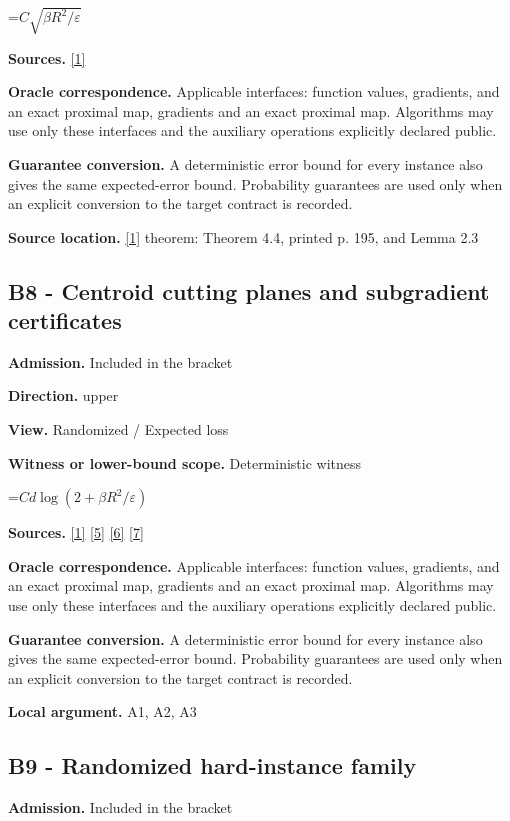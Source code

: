 \documentclass[10pt,a4paper]{article}
\newcommand{\AtlasMath}[1]{\par\begingroup\centering\setbox0=\hbox{$\displaystyle #1$}\ifdim\wd0>1.4\linewidth\typeout{ATLAS WIDE FORMULA: \the\wd0}\fi\ifdim\wd0>\linewidth\resizebox{\linewidth}{!}{\box0}\else\box0\fi\par\endgroup}
\begin{document}
\AtlasMath{C\sqrt{\beta R^2/\varepsilon}}
\textbf{Sources.} \href{https://www.tau.ac.il/~becka/FISTA.pdf}{[1]}

\textbf{Oracle correspondence.} Applicable interfaces: function values, gradients, and an exact proximal map, gradients and an exact proximal map. Algorithms may use only these interfaces and the auxiliary operations explicitly declared public.

\textbf{Guarantee conversion.} A deterministic error bound for every instance also gives the same expected-error bound. Probability guarantees are used only when an explicit conversion to the target contract is recorded.

\textbf{Source location.} \href{https://www.tau.ac.il/~becka/FISTA.pdf}{[1]} theorem: Theorem 4.4, printed p. 195, and Lemma 2.3

\subsection{B8 - Centroid cutting planes and subgradient certificates}
\textbf{Admission.} Included in the bracket

\textbf{Direction.} upper

\textbf{View.} Randomized / Expected loss

\textbf{Witness or lower-bound scope.} Deterministic witness

\AtlasMath{Cd\log(2+\beta R^2/\varepsilon)}
\textbf{Sources.} \href{https://www.tau.ac.il/~becka/FISTA.pdf}{[1]} \href{https://arxiv.org/pdf/1405.4980}{[5]} \href{https://www2.isye.gatech.edu/~nemirovs/MOR_AccuracyCertificates.pdf}{[6]} \href{https://arxiv.org/pdf/2609.20701}{[7]}

\textbf{Oracle correspondence.} Applicable interfaces: function values, gradients, and an exact proximal map, gradients and an exact proximal map. Algorithms may use only these interfaces and the auxiliary operations explicitly declared public.

\textbf{Guarantee conversion.} A deterministic error bound for every instance also gives the same expected-error bound. Probability guarantees are used only when an explicit conversion to the target contract is recorded.

\textbf{Local argument.} A1, A2, A3

\subsection{B9 - Randomized hard-instance family}
\textbf{Admission.} Included in the bracket
\end{document}
